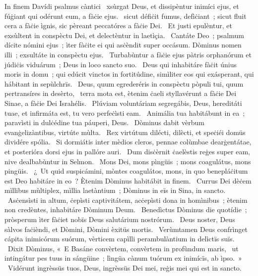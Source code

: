 { In finem Davídi psalmus càntici}
{%
~xsùrgat Deus, et dissipèntur inimíci ejus, et fúġiant qui odérunt eum, a fàċie ejus. 
~sicut défiċit fumus, defìċiant~; sicut fluit cera a fàċie ìgnis, sic pèreant peccatóres a fàċie Dei. 
~Et justi epulèntur, et exsùltent in conspèctu Dei, et delectèntur in laetìçia. 
~Cantáte Deo~; psalmum dícite nómini ejus~; ìter fàċite ei qui asċèndit super occásum. Dòminus nomen illi~; exsultáte in conspèctu ejus. 
~Turbabùntur a fàċie ejus pàtris orphanórum et júdiċis viduárum~; Deus in loco sancto suo. 
~Deus qui inhabitáre fàċit únius moris in domu~; qui edúcit vinctos in fortitúdine, simìliter eos qui exásperant, qui hábitant in sepùlchrïs. 
~Deus, quum egrederéris in conspèctu pòpuli tui, quum pertransíres in desèrto, 
~terra mota est, ètenim ċaeli styllavérunt a fàċie Dei Sinae, a fàċie Dei Israhélis. 
~Plúviam voluntáriam segregábis, Deus, hereditáti tuae, et infirmáta est, tu vero perfeċìsti eam. 
~Animália tua habitábunt in ea~; paravìsti in dulċédine tua páuperi, Deus. 
~Dòminus dabit vèrbum evanġelizàntibus, virtúte mùlta. 
~Rex virtútum dilécti, dilècti, et speċiéi domüs dividére spólia. 
~Si dormiátis inter mèdios cleros, pennae colùmbae dearġentátae, et posterióra dorsi ejus in pallóre auri. 
~Dum disċèrnit ċaelèstis reġes super eam, nive dealbabùntur in Selmon. 
~Mons Dei, mons pìngüis~; mons coagulátus, mons pingüis. 
~¿~Ut quid suspicámini, mòntes coagulátos, mons, in quo benepláċitum est Deo habitáre in eo~? Ètenim Dòminus habitábit in finem. 
~Currus Dei dèċem mìllibus mùltiplex, mìllia laetàntium~; Dòminus in eïs in Sina, in sancto. 
~Asċensìsti in altum, ċepìsti captivitátem, acċepìsti dona in homìnibus~; ètenim non credèntes, inhabitáre Dòminum Deum. 
~Benedìctus Dòminus die quotídie~; pròsperum ìter fàċiet nobïs Deus salutárium nostrórum. 
~Deus noster, Deus sàlvos faċièndi, et Dòmini, Dòmini èxitüs mortis. 
~Verùmtamen Deus confrìnget cápita inimicórum suórum, vèrticem capìlli perambulàntium in delìctïs suïs. 
~Dixit Dòminus, «~E Basáne convèrtem, convèrtem in profùndum maris, 
~ut intingátur pes tuus in sángüine~; lìngüa cànum tuórum ex inimícïs, ab ìpso.~»
~Vidérunt ingrèssüs tuos, Deus, ingrèssüs Dei mei, reġis mei qui est in sancto. 
}
